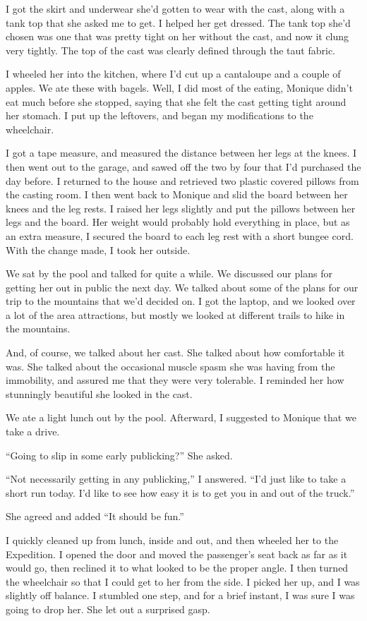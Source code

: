 I got the skirt and underwear she'd gotten to wear with the cast, along with a tank top that
she asked me to get. I helped her get dressed. The tank top she'd chosen was one that was pretty
tight on her without the cast, and now it clung very tightly. The top of the cast was clearly
defined through the taut fabric.

I wheeled her into the kitchen, where I'd cut up a cantaloupe and a couple of apples. We
ate these with bagels. Well, I did most of the eating, Monique didn't eat much before she
stopped, saying that she felt the cast getting tight around her stomach. I put up the leftovers,
and began my modifications to the wheelchair.

I got a tape measure, and measured the distance between her legs at the knees. I then went
out to the garage, and sawed off the two by four that I'd purchased the day before. I returned
to the house and retrieved two plastic covered pillows from the casting room. I then went back
to Monique and slid the board between her knees and the leg rests. I raised her legs slightly
and put the pillows between her legs and the board. Her weight would probably hold everything in
place, but as an extra measure, I secured the board to each leg rest with a short bungee cord.
With the change made, I took her outside.

We sat by the pool and talked for quite a while. We discussed our plans for getting her out
in public the next day. We talked about some of the plans for our trip to the mountains that
we'd decided on. I got the laptop, and we looked over a lot of the area attractions, but mostly
we looked at different trails to hike in the mountains.

And, of course, we talked about her cast. She talked about how comfortable it was. She
talked about the occasional muscle spasm she was having from the immobility, and assured me that
they were very tolerable. I reminded her how stunningly beautiful she looked in the cast.

We ate a light lunch out by the pool. Afterward, I suggested to Monique that we take a
drive.

``Going to slip in some early publicking?'' She asked.

``Not necessarily getting in any publicking,'' I answered. ``I'd just like to take a short run
today. I'd like to see how easy it is to get you in and out of the truck.''

She agreed and added ``It should be fun.''

I quickly cleaned up from lunch, inside and out, and then wheeled her to the Expedition. I
opened the door and moved the passenger's seat back as far as it would go, then reclined it to
what looked to be the proper angle. I then turned the wheelchair so that I could get to her from
the side. I picked her up, and I was slightly off balance. I stumbled one step, and for a brief
instant, I was sure I was going to drop her. She let out a surprised gasp.

